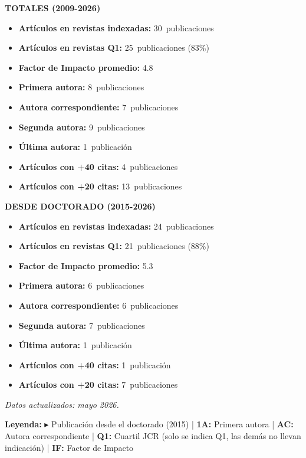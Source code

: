 \documentclass[11pt,a4paper]{article}
\begin{document}
\begin{minipage}[t]{0.48\textwidth}
\raggedright
\textbf{TOTALES (2009-2026)}
\begin{itemize}[leftmargin=*,label={}]
    \item \textbf{Artículos en revistas indexadas:} 30~publicaciones
    \item \textbf{Artículos en revistas Q1:} 25~publicaciones (83\%)
    \item \textbf{Factor de Impacto promedio:} 4.8
    \item \textbf{Primera autora:} 8~publicaciones
    \item \textbf{Autora correspondiente:} 7~publicaciones
    \item \textbf{Segunda autora:} 9~publicaciones
    \item \textbf{Última autora:} 1~publicación
    \item \textbf{Artículos con +40 citas:} 4~publicaciones
    \item \textbf{Artículos con +20 citas:} 13~publicaciones
\end{itemize}
\end{minipage}%
\hfill
\begin{minipage}[t]{0.48\textwidth}
\raggedright
\textbf{DESDE DOCTORADO (2015-2026)}
\begin{itemize}[leftmargin=*,label={}]
    \item \textbf{Artículos en revistas indexadas:} 24~publicaciones
    \item \textbf{Artículos en revistas Q1:} 21~publicaciones (88\%)
    \item \textbf{Factor de Impacto promedio:} 5.3
    \item \textbf{Primera autora:} 6~publicaciones
    \item \textbf{Autora correspondiente:} 6~publicaciones
    \item \textbf{Segunda autora:} 7~publicaciones
    \item \textbf{Última autora:} 1~publicación
    \item \textbf{Artículos con +40 citas:} 1~publicación
    \item \textbf{Artículos con +20 citas:} 7~publicaciones
\end{itemize}
\end{minipage}

\vspace{0.5em}
\noindent\textit{\small Datos actualizados: mayo 2026.}

\vspace{0.3em}
\noindent\textbf{Leyenda:} $\blacktriangleright$ Publicación desde el doctorado (2015) | \textbf{1A:} Primera autora | \textbf{AC:} Autora correspondiente | \textbf{Q1:} Cuartil JCR (solo se indica Q1, las demás no llevan indicación) | \textbf{IF:} Factor de Impacto
\end{document}
